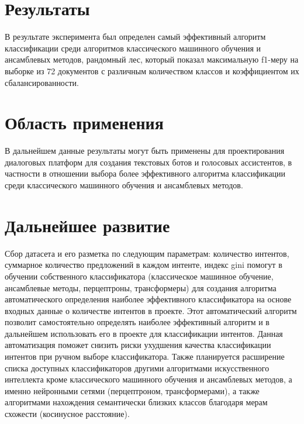\documentclass{article}
\begin{document}
\section{Результаты}
В результате эксперимента был определен самый эффективный алгоритм классификации среди алгоритмов классического машинного обучения и ансамблевых методов, рандомный лес, который показал максимальную f1-меру на выборке из 72 документов с различным количеством классов и коэффициентом их сбалансированности. 

\section{Область применения}
В дальнейшем данные результаты могут быть применены для проектирования диалоговых платформ для создания текстовых ботов и голосовых ассистентов, в частности в отношении выбора более эффективного алгоритма классификации среди классического машинного обучения и ансамблевых методов. 

\section{Дальнейшее развитие}
Сбор датасета и его разметка по следующим параметрам: количество интентов, суммарное количество предложений в каждом интенте, индекс gini помогут в обучении собственного классификатора (классическое машинное обучение, ансамблевые методы, перцептроны, трансформеры) для создания алгоритма автоматического определения наиболее эффективного классификатора на основе входных данные о количестве интентов в проекте. Этот автоматический алгоритм позволит самостоятельно определять наиболее эффективный алгоритм и в дальнейшем использовать его в проекте для классификации интентов. Данная автоматизация поможет снизить риски ухудшения качества классификации интентов при ручном выборе классификатора.
Также планируется расширение списка доступных классификаторов другими алгоритмами искусственного интеллекта кроме классического машинного обучения и ансамблевых методов, а именно нейронными сетями (перцептроном, трансформерами), а также алгоритмами нахождения семантически близких классов благодаря мерам схожести (косинусное расстояние).
\end{document}
